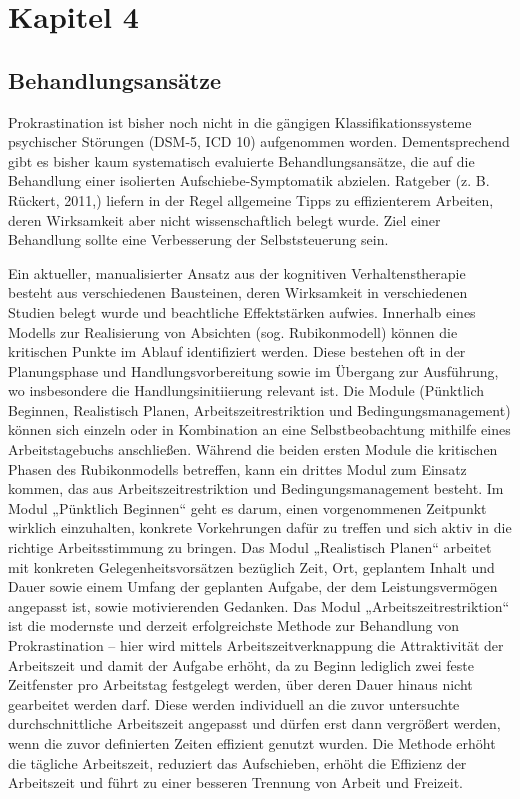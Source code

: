 \chapter{Kapitel 4}
\label{cha:kapitel-4}

\section{Behandlungsansätze}
\label{sec:behandlungsansätze}
Prokrastination ist bisher noch nicht in die gängigen Klassifikationssysteme psychischer Störungen (DSM-5, ICD 10) aufgenommen worden. Dementsprechend gibt es bisher kaum systematisch evaluierte Behandlungsansätze, die auf die Behandlung einer isolierten Aufschiebe-Symptomatik abzielen. Ratgeber (z. B. Rückert, 2011\cite{wiki},) liefern in der Regel allgemeine Tipps zu effizienterem Arbeiten, deren Wirksamkeit aber nicht wissenschaftlich belegt wurde. Ziel einer Behandlung sollte eine Verbesserung der Selbststeuerung sein.

Ein aktueller, manualisierter Ansatz\cite{hoecker:2013} aus der kognitiven Verhaltenstherapie besteht aus verschiedenen Bausteinen, deren Wirksamkeit in verschiedenen Studien\cite{wiki} belegt wurde und beachtliche Effektstärken aufwies. Innerhalb eines Modells zur Realisierung von Absichten (sog. Rubikonmodell) können die kritischen Punkte im Ablauf identifiziert werden. Diese bestehen oft in der Planungsphase und Handlungsvorbereitung sowie im Übergang zur Ausführung, wo insbesondere die Handlungsinitiierung relevant ist. Die Module (Pünktlich Beginnen, Realistisch Planen, Arbeitszeitrestriktion und Bedingungsmanagement) können sich einzeln oder in Kombination an eine Selbstbeobachtung mithilfe eines Arbeitstagebuchs anschließen. Während die beiden ersten Module die kritischen Phasen des Rubikonmodells betreffen, kann ein drittes Modul zum Einsatz kommen, das aus Arbeitszeitrestriktion und Bedingungsmanagement besteht. Im Modul „Pünktlich Beginnen“ geht es darum, einen vorgenommenen Zeitpunkt wirklich einzuhalten, konkrete Vorkehrungen dafür zu treffen und sich aktiv in die richtige Arbeitsstimmung zu bringen. Das Modul „Realistisch Planen“ arbeitet mit konkreten Gelegenheitsvorsätzen bezüglich Zeit, Ort, geplantem Inhalt und Dauer sowie einem Umfang der geplanten Aufgabe, der dem Leistungsvermögen angepasst ist, sowie motivierenden Gedanken. Das Modul „Arbeitszeitrestriktion“ ist die modernste und derzeit erfolgreichste Methode zur Behandlung von Prokrastination – hier wird mittels Arbeitszeitverknappung die Attraktivität der Arbeitszeit und damit der Aufgabe erhöht, da zu Beginn lediglich zwei feste Zeitfenster pro Arbeitstag festgelegt werden, über deren Dauer hinaus nicht gearbeitet werden darf. Diese werden individuell an die zuvor untersuchte durchschnittliche Arbeitszeit angepasst und dürfen erst dann vergrößert werden, wenn die zuvor definierten Zeiten effizient genutzt wurden. Die Methode erhöht die tägliche Arbeitszeit, reduziert das Aufschieben, erhöht die Effizienz der Arbeitszeit und führt zu einer besseren Trennung von Arbeit und Freizeit.